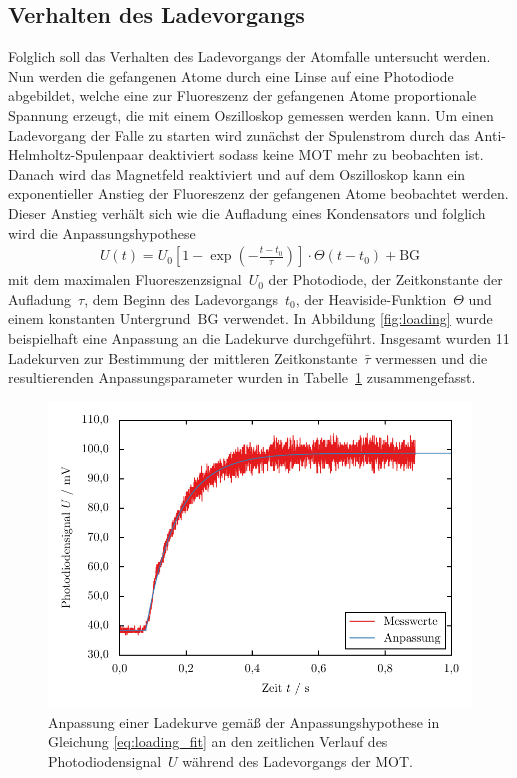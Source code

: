 \documentclass[11pt, a4paper]{article}
\numberwithin{equation}{section}
\begin{document}
\subsection{Verhalten des Ladevorgangs}
Folglich soll das Verhalten des Ladevorgangs der Atomfalle untersucht werden.
Nun werden die gefangenen Atome durch eine Linse auf eine Photodiode abgebildet, welche eine zur Fluoreszenz der gefangenen Atome proportionale Spannung erzeugt, die mit einem Oszilloskop gemessen werden kann.
Um einen Ladevorgang der Falle zu starten wird zunächst der Spulenstrom durch das Anti-Helmholtz-Spulenpaar deaktiviert sodass keine MOT mehr zu beobachten ist.
Danach wird das Magnetfeld reaktiviert und auf dem Oszilloskop kann ein exponentieller Anstieg der Fluoreszenz der gefangenen Atome beobachtet werden.
Dieser Anstieg verhält sich wie die Aufladung eines Kondensators und folglich wird die Anpassungshypothese
\begin{align}
	U(t) =  U_0 \left[ 1 - \exp\left( - \frac{t - t_0}{\tau} \right) \right] \cdot \Theta(t - t_0) + \mathrm{BG}
	\label{eq:loading_fit}
\end{align}
mit dem maximalen Fluoreszenzsignal~$U_0$ der Photodiode, der Zeitkonstante der Aufladung~$\tau$, dem Beginn des Ladevorgangs~$t_0$, der Heaviside-Funktion~$\Theta$ und einem konstanten Untergrund~$\mathrm{BG}$ verwendet.
In Abbildung \ref{fig:loading} wurde beispielhaft eine Anpassung an die Ladekurve durchgeführt.
Insgesamt wurden 11 Ladekurven zur Bestimmung der mittleren Zeitkonstante~$\bar{\tau}$ vermessen und die resultierenden Anpassungsparameter wurden in Tabelle~\ref{tab:loading_params} zusammengefasst.
\begin{figure}[htbp]
	\centering
	\includegraphics{./figures/loading/loading11.pdf}
	\caption{Anpassung einer Ladekurve gemäß der Anpassungshypothese in Gleichung \eqref{eq:loading_fit} an den zeitlichen Verlauf des Photodiodensignal~$U$ während des Ladevorgangs der MOT.}
	\label{fig:loading}
	
	\vspace{1cm}
	
	\resizebox{\textwidth}{!}{
		
	}
	\label{tab:loading_params}
\end{figure}
\end{document}
